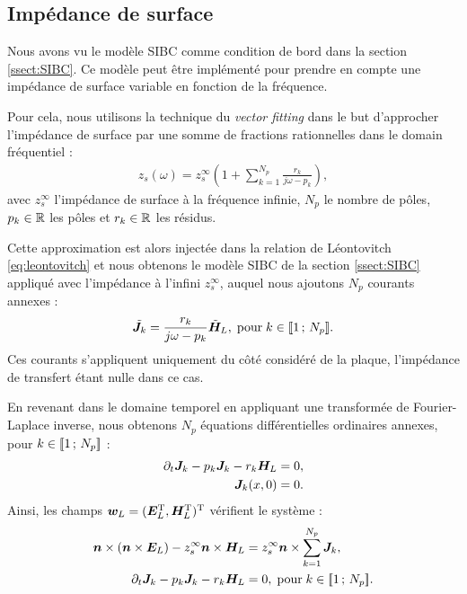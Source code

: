 \subsection{Impédance de surface}
\label{ssect:SIBC_plaque}


Nous avons vu le modèle SIBC comme condition de bord dans la section
\ref{ssect:SIBC}. Ce modèle peut être implémenté pour prendre en compte
une impédance de surface variable en fonction de la fréquence.

Pour cela, nous utilisons la technique du \textit{vector fitting} \cite{772353}
dans le but d'approcher l'impédance de surface par une somme de fractions
rationnelles dans le domain fréquentiel :
\begin{align}
	z_s (\omega) = z_s^\infty \left( 1 +
	\sum_{k = 1}^{N_p} \frac{r_k}{j \omega - p_k} \right)
	\label{eq:impedance_surface_vf} ,
\end{align}
avec $z_s^\infty$ l'impédance de surface à la fréquence infinie,
$N_p$ le nombre de pôles, $p_k \in \mathbb{R}$
les pôles et $r_k \in \mathbb{R}$ les résidus.

Cette approximation est alors injectée dans la relation de Léontovitch
\eqref{eq:leontovitch} et nous obtenons le modèle SIBC de la section
\ref{ssect:SIBC} appliqué avec l'impédance à l'infini $z_s^\infty$, auquel
nous ajoutons $N_p$ courants annexes :
\begin{align}
	\tilde{\bm{J}}_k =  \frac{r_k}{j \omega - p_k} \tilde{\bm{H}}_L ,
	\; \mathrm{pour} \; k \in \lbrack\!\lbrack1\,;\,N_p\rbrack\!\rbrack .
\end{align}
Ces courants s'appliquent uniquement du côté considéré de la plaque,
l'impédance de transfert étant nulle dans ce cas.

En revenant dans le domaine temporel en appliquant une transformée de Fourier-Laplace
inverse, nous obtenons $N_p$ équations différentielles ordinaires annexes,
pour $k \in \lbrack\!\lbrack1\,;\,N_p\rbrack\!\rbrack$ :
\begin{subequations}
	\begin{align}
		\partial_{t} \bm{J}_k - p_k \bm{J}_k - r_k \bm{H}_L &= 0 , \\
		\bm{J}_k(x, 0) &= 0 .
	\end{align}
\end{subequations}
Ainsi, les champs $\bm{w}_L = (\bm{E}_L^{\mathrm{T}},\bm{H}_L^{\mathrm{T}})^{\mathrm{T}}$
vérifient le système :
\begin{subequations}
	\begin{align}
	\bm{n} \times (\bm{n} \times \bm{E}_L) - z_s^\infty \bm{n} \times \bm{H}_L &=
	z_s^\infty \bm{n} \times \sum_{k = 1}^{N_p} \bm{J}_k , \\
	\partial_{t} \bm{J}_k - p_k \bm{J}_k - r_k \bm{H}_L &= 0 ,
	\; \mathrm{pour} \; k \in \lbrack\!\lbrack1\,;\,N_p\rbrack\!\rbrack .
	\end{align}
\end{subequations}

